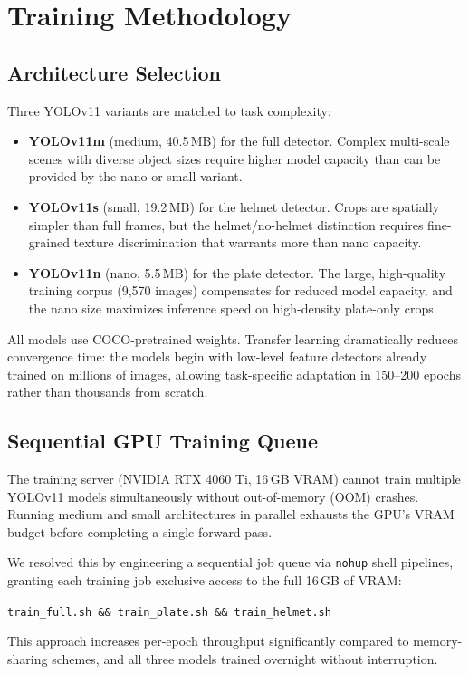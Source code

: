 \documentclass[10pt,twocolumn]{article}
\begin{document}
\section{Training Methodology}

\subsection{Architecture Selection}

Three YOLOv11 variants are matched to task complexity:

\begin{itemize}
  \item \textbf{YOLOv11m} (medium, 40.5\,MB) for the full detector. Complex
        multi-scale scenes with diverse object sizes require higher model
        capacity than can be provided by the nano or small variant.
  \item \textbf{YOLOv11s} (small, 19.2\,MB) for the helmet detector. Crops
        are spatially simpler than full frames, but the helmet/no-helmet
        distinction requires fine-grained texture discrimination that warrants
        more than nano capacity.
  \item \textbf{YOLOv11n} (nano, 5.5\,MB) for the plate detector. The large,
        high-quality training corpus (9{,}570 images) compensates for reduced
        model capacity, and the nano size maximizes inference speed on
        high-density plate-only crops.
\end{itemize}

All models use COCO-pretrained weights. Transfer learning dramatically reduces
convergence time: the models begin with low-level feature detectors already
trained on millions of images, allowing task-specific adaptation in 150--200
epochs rather than thousands from scratch.

\subsection{Sequential GPU Training Queue}

The training server (NVIDIA RTX 4060 Ti, 16\,GB VRAM) cannot train multiple
YOLOv11 models simultaneously without out-of-memory (OOM) crashes. Running
medium and small architectures in parallel exhausts the GPU's VRAM budget
before completing a single forward pass.

We resolved this by engineering a sequential job queue via \texttt{nohup}
shell pipelines, granting each training job exclusive access to the full
16\,GB of VRAM:
\begin{center}
\small\texttt{train\_full.sh \&\& train\_plate.sh \&\& train\_helmet.sh}
\end{center}
This approach increases per-epoch throughput significantly compared to memory-
sharing schemes, and all three models trained overnight without interruption.
\end{document}
